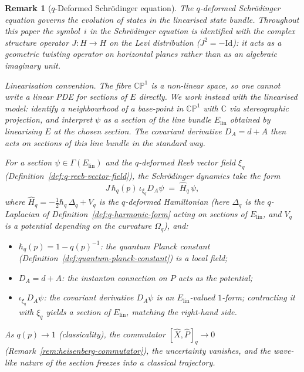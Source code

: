 \documentclass[12pt,a4paper]{report}
\newtheorem{remark}[theorem]{Remark}
\begin{document}
\begin{remark}[$q$-Deformed Schr\"odinger equation]
\label{rem:schrodinger-jet-coaction}
The $q$-deformed Schr\"odinger equation governs the evolution of states
in the linearised state bundle.  Throughout this paper the symbol~$i$ in
the Schr\"odinger equation is identified with the complex structure
operator $J \colon H \to H$ on the Levi distribution ($J^2 = -\mathrm{Id}$):
it acts as a geometric twisting operator on horizontal planes rather than
as an algebraic imaginary unit.

\medskip\noindent\textit{Linearisation convention.}\;
The fibre $\mathbb{CP}^1$ is a non-linear space, so one cannot write a
linear PDE for sections of $E$ directly.  We work instead with the
\emph{linearised} model: identify a neighbourhood of a base-point in
$\mathbb{CP}^1$ with $\mathbb{C}$ via stereographic projection, and
interpret $\psi$ as a section of the line bundle $E_{\mathrm{lin}}$
obtained by linearising $E$ at the chosen section.  The covariant
derivative $D_A = d + A$ then acts on sections of this line bundle in the
standard way.

For a section $\psi \in \Gamma(E_{\mathrm{lin}})$ and the $q$-deformed Reeb
vector field $\xi_q$ (Definition~\ref{def:q-reeb-vector-field}), the
Schr\"odinger dynamics take the form
\[
  J\,\hbar_q(p)\,\iota_{\xi_q} D_A \psi \;=\; \hat{H}_q\, \psi,
\]
where $\hat{H}_q = -\tfrac{1}{2}\hbar_q\,\Delta_q + V_q$ is the
\emph{$q$-deformed Hamiltonian} (here $\Delta_q$ is the $q$-Laplacian of
Definition~\ref{def:q-harmonic-form} acting on sections of
$E_{\mathrm{lin}}$, and $V_q$ is a potential depending on the curvature
$\Omega_q$), and:
\begin{itemize}
  \item $\hbar_q(p) = 1 - q(p)^{-1}$: the quantum Planck constant
        (Definition~\ref{def:quantum-planck-constant}) is a local field;
  \item $D_A = d + A$: the instanton connection on $P$ acts as the potential;
  \item $\iota_{\xi_q} D_A \psi$: the covariant derivative $D_A\psi$ is an
        $E_{\mathrm{lin}}$-valued $1$-form; contracting it with $\xi_q$
        yields a section of $E_{\mathrm{lin}}$, matching the right-hand side.
\end{itemize}
As $q(p) \to 1$ (classicality), the commutator
$[\hat{X}, \hat{P}]_q \to 0$ (Remark~\ref{rem:heisenberg-commutator}), the
uncertainty vanishes, and the wave-like nature of the section freezes into a
classical trajectory.


\end{remark}
\end{document}
